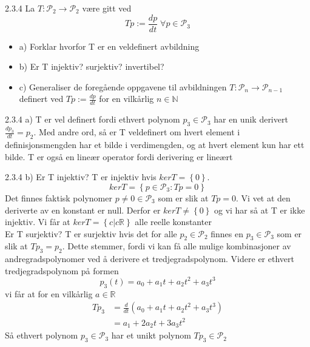 \documentclass[a4paper,norsk]{article}
\begin{document}
\begin{oppgavebox}{2.3.4}{}
La $ T: \mathcal{P}_2 \rightarrow \mathcal{P}_2 $ være gitt ved
\[
    Tp := \frac{ dp }{ dt } \; \forall p \in \mathcal{P}_3
\]
\begin{itemize}
  \item a) Forklar hvorfor T er en veldefinert avbildning
  \item b) Er T injektiv? surjektiv? invertibel?
  \item c) Generaliser de foregående oppgavene til avbildningen $ T: \mathcal{P}_n \rightarrow \mathcal{P}_{n-1} $ definert ved $ Tp := \frac{ dp }{ dt } $  for en vilkårlig $ n \in \mathbb{N} $ 
\end{itemize}

\begin{proofbox}{2.3.4 a)}{}
T er vel definert fordi ethvert polynom $ p_3 \in \mathcal{P}_3 $ har en unik derivert $ \frac{ dp_3 }{ dt } = p_2 $. Med andre ord, så er T veldefinert om hvert element i definisjonsmengden har et bilde i verdimengden, og at hvert element kun har ett bilde. T er også en lineær operator fordi derivering er lineært
\end{proofbox}

\begin{proofbox}{2.3.4 b)}{}
Er T injektiv? T er injektiv hvis $ ker T = \left\{ 0 \right\}  $. 
\[
    ker T = \left\{ p \in \mathcal{P}_3 : Tp = 0 \right\} 
\]
Det finnes faktisk polynomer $ p \neq 0 \in \mathcal{P}_3  $ som er slik at $ Tp = 0 $. Vi vet at den deriverte av en konstant er null. Derfor er $ ker T \neq \left\{ 0 \right\}  $ og vi har så at T er ikke injektiv. Vi får at $ ker T = \left\{ c | c  \mathbb{R} \right\}  $ alle reelle konstanter\\


Er T surjektiv? T er surjektiv hvis det for alle $ p_2 \in \mathcal{P}_2  $ finnes en $ p_3 \in \mathcal{P}_3 $ som er slik at $ Tp_3 = p_2 $. Dette stemmer, fordi vi kan få alle mulige kombinasjoner av andregradspolynomer ved å derivere et tredjegradspolynom. Videre er ethvert tredjegradspolynom på formen
\[
    p_3(t) = a_0 + a_1 t + a_2 t^2 + a_3 t^3
\]
vi får at for en vilkårlig $ a \in \mathbb{R} $ 
\begin{align*}
  Tp_3 &= \frac{ d }{ dt } \left( a_0 + a_1 t + a_2 t^2 + a_3 t^3 \right) \\
  &= a_1 + 2a_2 t + 3a_3 t^2
\end{align*}
Så ethvert polynom $ p_3 \in \mathcal{P}_3 $ har et unikt polynom $ Tp_3 \in \mathcal{P}_2 $ \\


\end{proofbox}
\end{oppgavebox}
\end{document}
